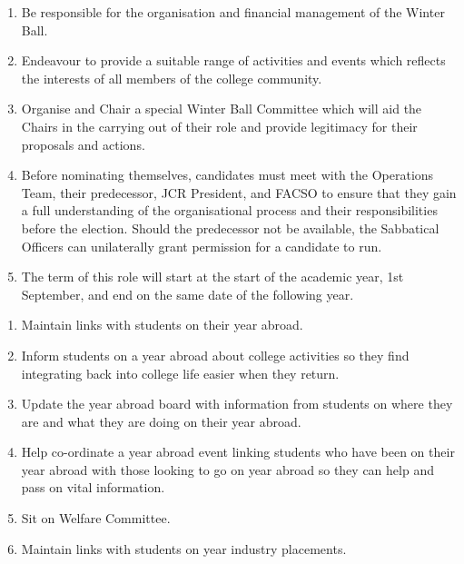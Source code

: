 \begin{enumerate}
    \item Be responsible for the organisation and financial management of the Winter Ball.
    \item Endeavour to provide a suitable range of activities and events which reflects the interests of all members of the college community.
    \item Organise and Chair a special Winter Ball Committee which will aid the Chairs in the carrying out of their role and provide legitimacy for their proposals and actions.
    \item Before nominating themselves, candidates must meet with the Operations Team, their predecessor, JCR President, and FACSO to ensure that they gain a full understanding of the organisational process and their responsibilities before the election. Should the predecessor not be available, the Sabbatical Officers can unilaterally grant permission for a candidate to run. 
    \item The term of this role will start at the start of the academic year, 1st September, and end on the same date of the following year.

    
\end{enumerate}

\begin{enumerate}
    \item Maintain links with students on their year abroad.
    \item Inform students on a year abroad about college activities so they find integrating back into college life easier when they return.
    \item Update the year abroad board with information from students on where they are and what they are doing on their year abroad.
    \item Help co-ordinate a year abroad event linking students who have been on their year abroad with those looking to go on year abroad so they can help and pass on vital information.
    \item Sit on Welfare Committee.
    \item Maintain links with students on year industry placements.
\end{enumerate}


